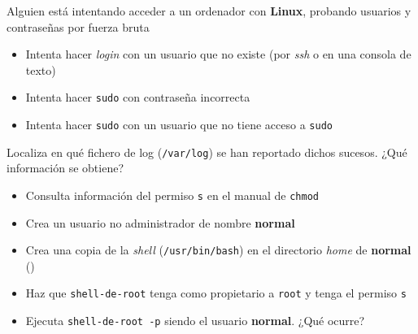 \begin{homeworkProblem}


  \begin{multicols}{2}

    \begin{Actividad}
      Alguien está intentando acceder a un ordenador con \textbf{Linux}, probando usuarios y contraseñas por fuerza bruta
      \begin{itemize}
      \item Intenta hacer \textit{login} con un usuario que no existe (por \textit{ssh} o en una consola de texto)
      \item Intenta hacer \texttt{sudo} con contraseña incorrecta
      \item Intenta hacer \texttt{sudo} con un usuario que no tiene acceso a \texttt{sudo}
      \end{itemize}
    \end{Actividad}
    \columnbreak

    \null \vfill

    \begin{Actividad}
      Localiza en qué fichero de log (\texttt{/var/log}) se han reportado dichos sucesos. ¿Qué información se obtiene?
    \end{Actividad}

    \vfill \null

  \end{multicols}

  
  \begin{itemize}
  \item Consulta información del permiso \texttt{s} en el manual de \texttt{chmod}
  \item Crea un usuario no administrador de nombre \textbf{normal}
  \item Crea una copia de la \textit{shell} (\texttt{/usr/bin/bash}) en el directorio \textit{home} de \textbf{normal} ()
  \item Haz que \texttt{shell-de-root} tenga como propietario a \texttt{root} y tenga el permiso \texttt{s}
  \item Ejecuta \texttt{shell-de-root -p} siendo el usuario \textbf{normal}. ¿Qué ocurre?
  \end{itemize}
\end{homeworkProblem}

